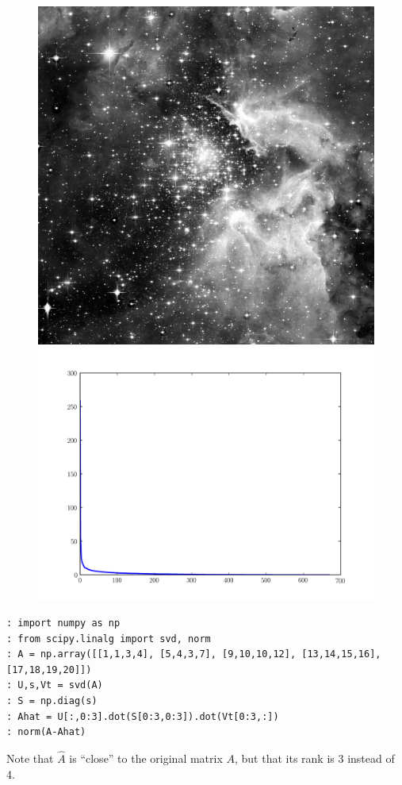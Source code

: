 \begin{figure}
\centering
\includegraphics[scale=.2]{hubble_red.png}
\includegraphics[scale=.4]{hubble_svals.pdf}
\end{figure}

\begin{lstlisting}
: import numpy as np
: from scipy.linalg import svd, norm
: A = np.array([[1,1,3,4], [5,4,3,7], [9,10,10,12], [13,14,15,16], [17,18,19,20]])
: U,s,Vt = svd(A)
: S = np.diag(s)
: Ahat = U[:,0:3].dot(S[0:3,0:3]).dot(Vt[0:3,:])
: norm(A-Ahat)
\end{lstlisting}
Note that $\widehat A$ is ``close'' to the original matrix $A$, but
that its rank is 3 instead of 4.

